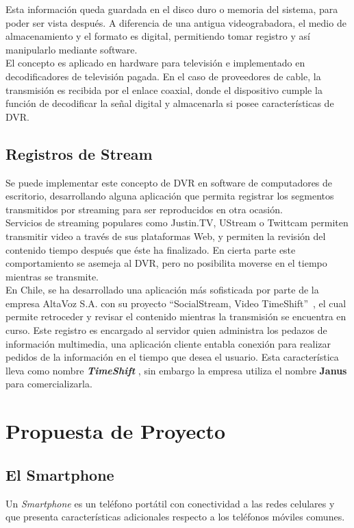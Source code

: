  Esta información queda guardada en el disco duro o memoria del sistema, para poder ser vista después. A diferencia de una antigua videograbadora, el medio de almacenamiento y el formato es digital, permitiendo tomar registro y así manipularlo mediante software.\\
 
	El concepto es aplicado en hardware para televisión e implementado en decodificadores de televisión pagada. En el caso de proveedores de cable, la transmisión es recibida por el enlace coaxial, donde el dispositivo cumple la función de decodificar la señal digital y almacenarla si posee características de DVR.

\subsection{Registros de Stream}

Se puede implementar este concepto de DVR en software de computadores de escritorio, desarrollando alguna aplicación que permita registrar los segmentos transmitidos por streaming para ser reproducidos en otra ocasión. \\

	Servicios de streaming populares como Justin.TV, UStream o Twittcam permiten transmitir video a través de sus plataformas Web, y permiten la revisión del contenido tiempo después que éste ha finalizado. En cierta parte este comportamiento se asemeja al DVR, pero no posibilita moverse en el tiempo mientras se transmite.\\

En Chile, se ha desarrollado una aplicación más sofisticada por parte de la empresa AltaVoz S.A. con su proyecto \textquotedblleft SocialStream, Video TimeShift\textquotedblright \ , el cual permite retroceder y revisar el contenido mientras la transmisión se encuentra en curso. Este registro es encargado al servidor quien administra los pedazos de información multimedia, una aplicación cliente entabla conexión para realizar pedidos de la información en el tiempo que desea el usuario.
Esta característica lleva como nombre \textbf{\textit{TimeShift}} \cite{cap1:time-shift}, sin embargo la empresa utiliza el nombre \textbf{Janus} \cite{cap1:altavoz-janus} para comercializarla.

\section{Propuesta de Proyecto}
\subsection{El Smartphone}
Un \textit{Smartphone} es un teléfono portátil con conectividad a las redes celulares y que presenta características adicionales respecto a los teléfonos móviles comunes.\\

